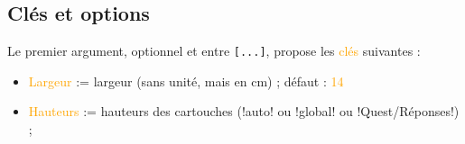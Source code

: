 \documentclass[french,a4paper,11pt]{article}
\newcommand\Cle[1]{{\small\sffamily\textlangle \textcolor{orange}{#1}\textrangle}}
\begin{document}
\begin{DemoCode}[]
\QuizzPrendrePlace{\lipsum[1][1-2]}
{\lipsum[2][1]}{\lipsum[2][2]}{\lipsum[2][3]}{\lipsum[2][5]}
\end{DemoCode}

\subsection{Clés et options}

\begin{tipblock}
Le premier argument, optionnel et entre \texttt{[...]}, propose les \Cle{clés} suivantes :

\begin{itemize}
	\item \Cle{Largeur} := largeur (sans unité, mais en cm) ; \hfill{}défaut : \Cle{14}
%	
	\item \Cle{Hauteurs} := hauteurs des cartouches (\motcletex!auto! ou \motcletex!global! ou \motcletex!Quest/Réponses!) ;
	

\end{itemize}
\end{tipblock}
\end{document}
